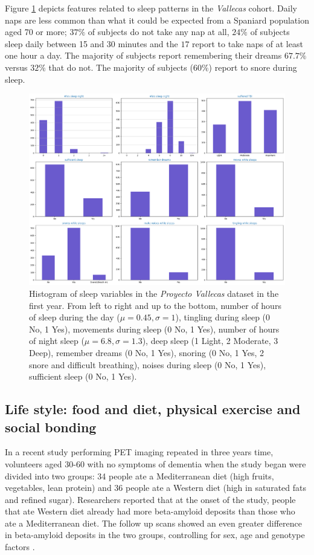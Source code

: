 \documentclass[11pt]{article}
\theoremstyle{definition}
\theoremstyle{remark}
\begin{document}
Figure \ref{fig:sleep} depicts features related to sleep patterns in the \emph{Vallecas} cohort. Daily naps are less common than what it could be expected from a Spaniard population aged 70 or more; $37\%$ of subjects do not take any nap at all, $24\%$ of subjects sleep daily between 15 and 30 minutes and the $17$ report to take naps of at least one hour a day. The majority of subjects report remembering their dreams $67.7\%$ versus $32\%$ that do not. The majority of subjects ($60\%$) report to snore during sleep. 
\begin{figure}[H]
        \centering
        \includegraphics[keepaspectratio, width=\linewidth]{figures/Fig_sleep}
        \caption{Histogram of sleep variables in the \emph{Proyecto Vallecas} dataset in the first year. From left to right and up to the bottom, number of hours of sleep during the day ($\mu=0.45, \sigma=1$), tingling during sleep (0 No, 1 Yes), movements during sleep (0 No, 1 Yes), number of hours of night sleep ($\mu=6.8, \sigma=1.3$), deep sleep (1 Light, 2 Moderate, 3 Deep), remember dreams (0 No, 1 Yes), snoring (0 No, 1 Yes, 2 snore and difficult breathing), noises during sleep (0 No, 1 Yes), sufficient sleep (0 No, 1 Yes).} 
        \label{fig:sleep}
\end{figure}


\subsection{Life style: food and diet, physical exercise and social bonding}
\label{ssse:life}

In a recent study performing PET imaging repeated in three years time, volunteers aged 30-60 with no symptoms of dementia when the study began were divided into two groups: 34 people ate a Mediterranean diet (high fruits, vegetables, lean protein) and 36 people ate a Western diet (high in saturated fats and refined sugar). Researchers reported that at the onset of the study, people that ate Western diet already had more beta-amyloid deposits than those who ate a Mediterranean diet. The follow up scans showed an even greater difference in beta-amyloid deposits in the two groups, controlling for sex, age and genotype factors \cite{berti2018mediterranean}.
\end{document}
